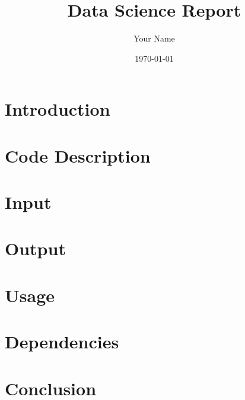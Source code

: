 \documentclass{article}
\begin{document}
\title{Data Science Report}
\author{Your Name}
\date{\today}

\maketitle

\section{Introduction}

\section{Code Description}

\section{Input}

\section{Output}

\section{Usage}

\section{Dependencies}

\section{Conclusion}
\end{document}
